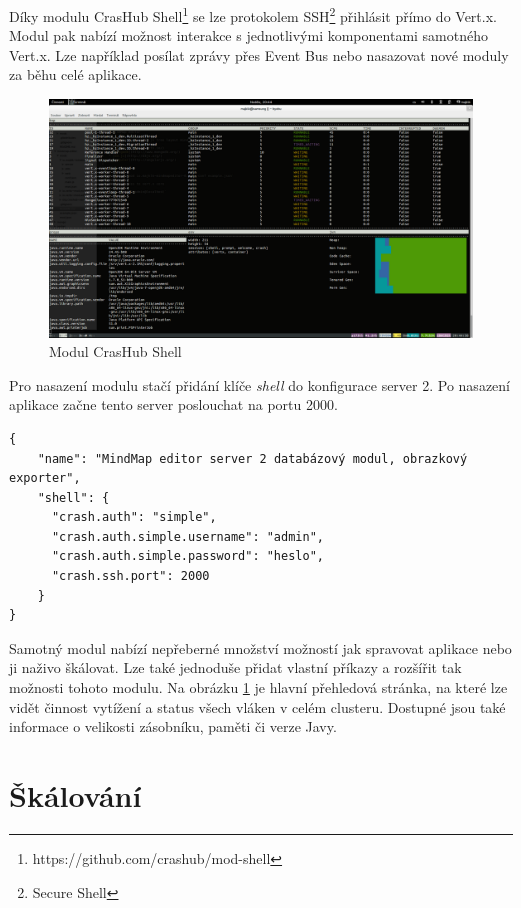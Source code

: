 Díky modulu CrasHub Shell\footnote{https://github.com/crashub/mod-shell} se lze protokolem SSH\footnote{Secure Shell} přihlásit přímo do Vert.x. Modul pak nabízí možnost interakce s jednotlivými komponentami samotného Vert.x. Lze například posílat zprávy přes Event Bus nebo nasazovat nové moduly za běhu celé aplikace.
\begin{figure}[h]
\begin{centering}
\includegraphics[scale=0.21]{obrazky/real_interaction}
\par\end{centering}
\caption{Modul CrasHub Shell\label{fig:real_interaction}}
\end{figure}

Pro nasazení modulu stačí přidání klíče \emph{shell} do konfigurace server 2. Po nasazení aplikace začne tento server poslouchat na portu 2000.

\begin{lstlisting}[caption={Konfigurace modulu CrasHub Shell},label=confServ2]
{
    "name": "MindMap editor server 2 databázový modul, obrazkový exporter",
    "shell": {
      "crash.auth": "simple",
      "crash.auth.simple.username": "admin",
      "crash.auth.simple.password": "heslo",
      "crash.ssh.port": 2000
    }
}
\end{lstlisting}

Samotný modul nabízí nepřeberné množství možností jak spravovat aplikace nebo ji naživo škálovat. Lze také jednoduše přidat vlastní příkazy a rozšířit tak možnosti tohoto modulu. Na obrázku \ref{fig:real_interaction} je hlavní přehledová stránka, na které lze vidět činnost vytížení a status všech vláken v celém clusteru. Dostupné jsou také informace o velikosti zásobníku, paměti či verze Javy. 

\section{Škálování}\label{sub:Scaling}

